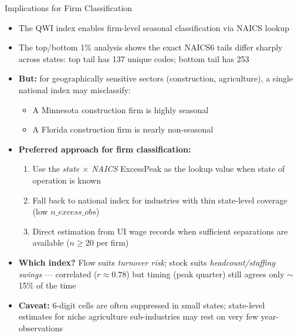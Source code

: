 \documentclass[aspectratio=169]{beamer}
\begin{document}
\begin{frame}{Implications for Firm Classification}
  \begin{itemize}
    \item The QWI index enables firm-level seasonal classification via NAICS lookup
    \item The top/bottom 1\% analysis shows the exact NAICS6 tails differ sharply
          across states: top tail has 137 unique codes; bottom tail has 253
    \item \textbf{But:} for geographically sensitive sectors (construction,
          agriculture), a single national index may misclassify:
    \begin{itemize}
      \item A Minnesota construction firm is highly seasonal
      \item A Florida construction firm is nearly non-seasonal
    \end{itemize}
    \bigskip
    \item \textbf{Preferred approach for firm classification:}
    \begin{enumerate}
      \item Use the \emph{state $\times$ NAICS} ExcessPeak as the lookup value
            when state of operation is known
      \item Fall back to national index for industries with thin state-level
            coverage (low $n\_excess\_obs$)
      \item Direct estimation from UI wage records when sufficient separations
            are available ($n \geq 20$ per firm)
    \end{enumerate}
    \smallskip
    \item \textbf{Which index?} Flow suits \emph{turnover risk}; stock suits
          \emph{headcount/staffing swings} --- correlated ($r \approx 0.78$)
          but timing (peak quarter) still agrees only $\sim$15\% of the time
    \item \textbf{Caveat:} 6-digit cells are often suppressed in small states;
          state-level estimates for niche agriculture sub-industries may rest on
          very few year-observations
  \end{itemize}
\end{frame}
\end{document}
